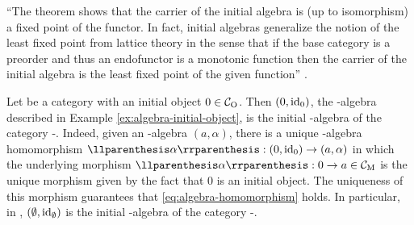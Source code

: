 ``The theorem shows that the carrier of the initial algebra is (up to
isomorphism) a fixed point of the functor. In fact, initial algebras
generalize the notion of the least fixed point from lattice theory in
the sense that if the base category is a preorder and thus an
endofunctor is a monotonic function then the carrier of the initial
algebra is the least fixed point of the given function''
\parencite[18]{vene-2000}.

\begin{example}%
  \label{ex:initial-algebra-initial-object}


  Let  be a category with an initial object $0 \in \mathcal{C}_{\operatorname{O}}$.
  Then $(0,\operatorname{id}_{0})$, the -algebra described in Example
  \ref{ex:algebra-initial-object}, is the initial -algebra of
  the category -\alg. Indeed, given an -algebra
  $(a,\alpha)$, there is a unique -algebra homomorphism
  $\cata{\alpha}: (0,\idO{0}) \to (a,\alpha)$ in which the underlying
  morphism $\cata{\alpha}: 0 \to a \in \catM{C}$ is the unique
  morphism given by the fact that $0$ is an initial object. The
  uniqueness of this morphism guarantees that
  \eqref{eq:algebra-homomorphism} holds. In particular, in \set,
  $(\emptyset,\operatorname{id}_{\emptyset})$ is the initial -algebra of the
  category -\alg.

\end{example}

